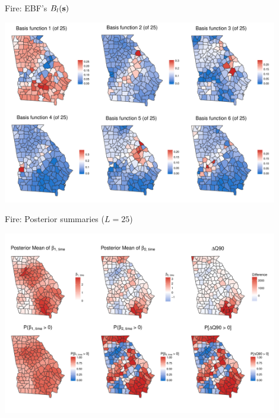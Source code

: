 \documentclass{beamer}
\begin{document}
\begin{frame}{Fire: EBF's $B_l(\mathbf{s})$}
	\begin{center}
		\includegraphics[width=0.9\textwidth]{fire-ebf-panel}
	\end{center}
\end{frame}


\begin{frame}{Fire: Posterior summaries ($L = 25$)}
	\begin{center}
		\includegraphics[width=0.9\textwidth]{fire-ebf-postpanel-slides}
	\end{center}
\end{frame}

%
\end{document}
